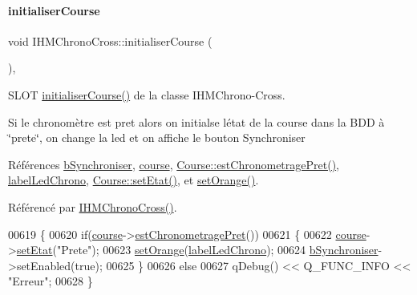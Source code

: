 \paragraph{\texorpdfstring{initialiser\+Course}{initialiserCourse}}
{\footnotesize\ttfamily void I\+H\+M\+Chrono\+Cross\+::initialiser\+Course (\begin{DoxyParamCaption}{ }\end{DoxyParamCaption})\hspace{0.3cm}{\ttfamily [private]}, {\ttfamily [slot]}}



S\+L\+OT \hyperlink{class_i_h_m_chrono_cross_adde019cc3799befac3fd9555e392eab9}{initialiser\+Course()} de la classe I\+H\+M\+Chrono-\/\+Cross. 

Si le chronomètre est pret alors on initialse l\textquotesingle{}état de la course dans la B\+DD à \char`\"{}prete\char`\"{}, on change la led et on affiche le bouton Synchroniser 

Références \hyperlink{class_i_h_m_chrono_cross_aaef501bd1190a5ec06a214d3265b8c0b}{b\+Synchroniser}, \hyperlink{class_i_h_m_chrono_cross_a03a8226c0e7f423d29302d9a06284ab4}{course}, \hyperlink{class_course_a44a14d431bd64a507f2c2aa5f465b1b0}{Course\+::est\+Chronometrage\+Pret()}, \hyperlink{class_i_h_m_chrono_cross_ad43bab2d9a06fe2fb198c56d8b9faab2}{label\+Led\+Chrono}, \hyperlink{class_course_a3ebcde1fa443cb20d71fb98af4d0c418}{Course\+::set\+Etat()}, et \hyperlink{class_i_h_m_chrono_cross_a7e2424925f588d7a1914befc3c6c832e}{set\+Orange()}.



Référencé par \hyperlink{class_i_h_m_chrono_cross_a479fc90733fba3e65fb06aa4a3adc02e}{I\+H\+M\+Chrono\+Cross()}.


\begin{DoxyCode}
00619 \{
00620     \textcolor{keywordflow}{if}(\hyperlink{class_i_h_m_chrono_cross_a03a8226c0e7f423d29302d9a06284ab4}{course}->\hyperlink{class_course_a44a14d431bd64a507f2c2aa5f465b1b0}{estChronometragePret}())
00621     \{
00622         \hyperlink{class_i_h_m_chrono_cross_a03a8226c0e7f423d29302d9a06284ab4}{course}->\hyperlink{class_course_a3ebcde1fa443cb20d71fb98af4d0c418}{setEtat}(\textcolor{stringliteral}{"Prete"});
00623         \hyperlink{class_i_h_m_chrono_cross_a7e2424925f588d7a1914befc3c6c832e}{setOrange}(\hyperlink{class_i_h_m_chrono_cross_ad43bab2d9a06fe2fb198c56d8b9faab2}{labelLedChrono});
00624         \hyperlink{class_i_h_m_chrono_cross_aaef501bd1190a5ec06a214d3265b8c0b}{bSynchroniser}->setEnabled(\textcolor{keyword}{true});
00625     \}
00626     \textcolor{keywordflow}{else}
00627         qDebug() << Q\_FUNC\_INFO << \textcolor{stringliteral}{"Erreur"};
00628 \}
\end{DoxyCode}
\mbox{\label{class_i_h_m_chrono_cross_a0e78f2d4d5e46c4551fc4517614a56d8}} 
